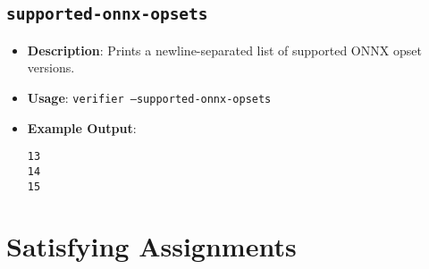 \subsection{\texttt{supported-onnx-opsets}}
\begin{itemize}
    \item \textbf{Description}: Prints a newline-separated list of supported ONNX opset versions.
    \item \textbf{Usage}: \texttt{verifier --supported-onnx-opsets}
    \item \textbf{Example Output}:
    \begin{lstlisting}[style=bash, numbers=none, frame=none, backgroundcolor=\color{white}]
13
14
15
    \end{lstlisting}
\end{itemize}

\section{Satisfying Assignments}\label{sec:satisfying_assignments}

